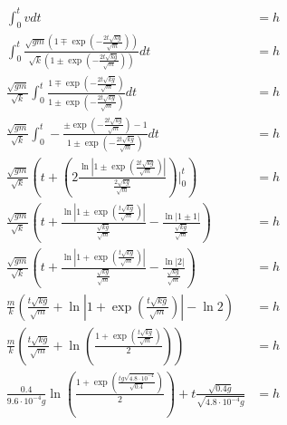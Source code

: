 \begin{align*}
    \int_0^t v dt                                                                                                                                                                                                & = h          \\
    \int_0^t \frac{\sqrt{gm}\left(1 \mp \exp\left(-\frac{2t\sqrt {kg}}{\sqrt m}\right)\right)}{\sqrt k\left(1 \pm \exp\left(-\frac{2t\sqrt {kg}}{\sqrt m}\right)\right)} dt                                      & = h          \\
    \frac{\sqrt{gm}}{\sqrt k}\int_0^t \frac{1 \mp \exp\left(-\frac{2t\sqrt {kg}}{\sqrt m}\right)}{1 \pm \exp\left(-\frac{2t\sqrt {kg}}{\sqrt m}\right)} dt                                                       & = h          \\
    \frac{\sqrt{gm}}{\sqrt k}\int_0^t -\frac{\pm \exp\left(-\frac{2t\sqrt {kg}}{\sqrt m}\right) - 1}{1 \pm \exp\left(-\frac{2t\sqrt {kg}}{\sqrt m}\right)} dt                                                    & = h          \\
    \frac{\sqrt{gm}}{\sqrt k}\left(t + \left(2\frac{\ln\left|1 \pm \exp\left(\frac{2t\sqrt {kg}}{\sqrt m}\right)\right|}{\frac{2\sqrt {kg}}{\sqrt m}}\right)\Bigg|_0^t\right)                                    & = h          \\
    \frac{\sqrt{gm}}{\sqrt k}\left(t + \frac{\ln\left|1 \pm \exp\left(\frac{t\sqrt {kg}}{\sqrt m}\right)\right|}{\frac{\sqrt {kg}}{\sqrt m}} - \frac{\ln\left|1 \pm 1\right|}{\frac{\sqrt {kg}}{\sqrt m}}\right) & = h          \\
    \frac{\sqrt{gm}}{\sqrt k}\left(t + \frac{\ln\left|1 + \exp\left(\frac{t\sqrt {kg}}{\sqrt m}\right)\right|}{\frac{\sqrt {kg}}{\sqrt m}} - \frac{\ln\left|2\right|}{\frac{\sqrt {kg}}{\sqrt m}}\right)         & = h          \\
    \frac{m}{k}\left(\frac{t\sqrt {kg}}{\sqrt m} + \ln\left|1 + \exp\left(\frac{t\sqrt {kg}}{\sqrt m}\right)\right| - \ln 2\right)                                                                               & = h          \\
    \frac{m}{k}\left(\frac{t\sqrt {kg}}{\sqrt m} + \ln\left(\frac{1 + \exp\left(\frac{t\sqrt {kg}}{\sqrt m}\right)}{2}\right)\right)                                                                             & = h          \\
    \frac{0.4}{9.6\cdot 10^{-4}g}\ln\left(\frac{1 + \exp\left(\frac{tg\sqrt {4.8\cdot 10^{-4}}}{\sqrt {0.4}}\right)}{2}\right) + t\frac{\sqrt {0.4 g}}{\sqrt{4.8 \cdot 10^{-4}g}}                                & = h          \\

\end{align*}
